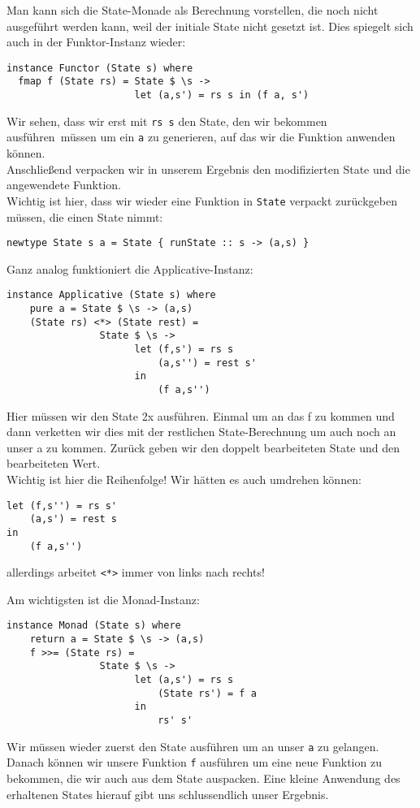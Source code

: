 \documentclass{beamer}
\begin{document}
\begin{frame}[fragile]
Man kann sich die State-Monade als Berechnung vorstellen, die noch nicht ausgeführt werden kann, weil der initiale State nicht gesetzt ist. Dies spiegelt sich auch in der Funktor-Instanz wieder:
\pause
\begin{verbatim}
instance Functor (State s) where
  fmap f (State rs) = State $ \s -> 
                      let (a,s') = rs s in (f a, s')
\end{verbatim}
\pause
Wir sehen, dass wir erst mit \texttt{rs s} den State, den wir bekommen \glqq ausführen\grqq \ müssen um ein \texttt{a} zu generieren, auf das wir die Funktion anwenden können.\\
Anschließend verpacken wir in unserem Ergebnis den modifizierten State und die angewendete Funktion.\\
\pause
Wichtig ist hier, dass wir wieder eine Funktion in \texttt{State} verpackt zurückgeben müssen, die einen State nimmt:
\begin{verbatim}
newtype State s a = State { runState :: s -> (a,s) }
\end{verbatim}

\end{frame}

\begin{frame}[fragile]
Ganz analog funktioniert die Applicative-Instanz:
\begin{verbatim}
instance Applicative (State s) where
    pure a = State $ \s -> (a,s)
    (State rs) <*> (State rest) =
                State $ \s ->
                      let (f,s') = rs s
                          (a,s'') = rest s'
                      in
                          (f a,s'')
\end{verbatim}
\pause
Hier müssen wir den State 2x ausführen. Einmal um an das f zu kommen und dann verketten wir dies mit der restlichen State-Berechnung um auch noch an unser a zu kommen. Zurück geben wir den doppelt bearbeiteten State und den bearbeiteten Wert.\\
\pause
Wichtig ist hier die Reihenfolge! Wir hätten es auch umdrehen können:
\begin{verbatim}
let (f,s'') = rs s'
    (a,s') = rest s
in
    (f a,s'')
\end{verbatim}
allerdings arbeitet \texttt{<*>} immer von links nach rechts!
\end{frame}

\begin{frame}[fragile]
Am wichtigsten ist die Monad-Instanz:
\begin{verbatim}
instance Monad (State s) where
    return a = State $ \s -> (a,s)
    f >>= (State rs) =
                State $ \s ->
                      let (a,s') = rs s
                          (State rs') = f a
                      in
                          rs' s'
\end{verbatim}
\pause
Wir müssen wieder zuerst den State ausführen um an unser \texttt{a} zu gelangen. Danach können wir unsere Funktion \texttt{f} ausführen um eine neue Funktion zu bekommen, die wir auch aus dem State auspacken. Eine kleine Anwendung des erhaltenen States hierauf gibt uns schlussendlich unser Ergebnis.
\end{frame}
\end{document}
